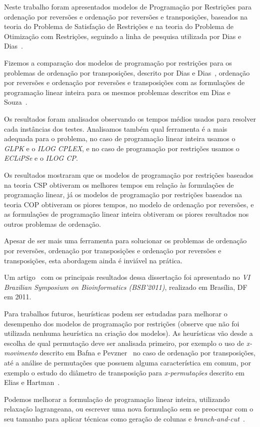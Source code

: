 Neste trabalho foram apresentados modelos de Programação por
Restrições para ordenação por reversões e ordenação por reversões e
transposições, baseados na teoria do Problema de Satisfação de
Restrições e na teoria do Problema de Otimização com Restrições,
seguindo a linha de pesquisa utilizada por Dias e
Dias~\cite{DiasDias*2009}.

Fizemos a comparação dos modelos de programação por restrições para os
problemas de ordenação por transposições, descrito por Dias e
Dias~\cite{DiasDias*2009}, ordenação por reversões e ordenação por
reversões e transposições com as formulações de programação linear
inteira para os mesmos problemas descritos em Dias e
Souza~\cite{DiasSouza*2007}.

Os resultados foram analisados observando os tempos médios usados para
resolver cada instâncias dos testes. Analisamos também qual ferramenta
é a mais adequada para o problema, no caso de programação linear
inteira usamos o \textit{GLPK} e o \textit{ILOG CPLEX}, e no caso de
programação por restrições usamos o \textit{ECLiPSe} e o \textit{ILOG
CP}.

Os resultados mostraram que os modelos de programação por restrições
baseados na teoria CSP obtiveram os melhores tempos em relação às
formulações de programação linear, já os modelos de programação por
restrições baseados na teoria COP obtiveram os piores tempos, no
modelo de ordenação por reversões, e as formulações de programação
linear inteira obtiveram os piores resultados nos outros problemas de
ordenação.

Apesar de ser mais uma ferramenta para solucionar os problemas de
ordenação por reversões, ordenação por transposições e ordenação por
reversões e transposições, esta abordagem ainda é inviável na
prática.

Um artigo~\cite{IizukaDias*2011} com os principais resultados dessa
dissertação foi apresentado no \textit{VI Brazilian Symposium on
Bioinformatics (BSB'2011)}, realizado em Brasília, DF em 2011.

Para trabalhos futuros, heurísticas podem ser estudadas para melhorar
o desempenho dos modelos de programação por restrições (observe que
não foi utilizada nenhuma heurística na criação dos modelos). As
heurísticas vão desde a escolha de qual permutação deve ser analisada
primeiro, por exemplo o uso de \textit{x-movimento} descrito em Bafna
e Pevzner~\cite{BafnaPevzner*1998} no caso de ordenação por
transposições, até a análise de permutações que possuem alguma
característica em comum, por exemplo o estudo do diâmetro de
transposição para \textit{x-permutações} descrito em Elias e
Hartman~\cite{EliasHartman*2006}.

Podemos melhorar a formulação de programação linear inteira,
utilizando relaxação lagrangeana, ou escrever uma nova formulação sem
se preocupar com o seu tamanho para aplicar técnicas como geração de
colunas
e \textit{branch-and-cut}~\cite{NemhauserWolsey*1988,Wolsey*1998}.
